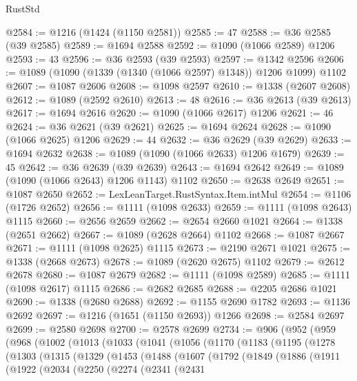 \begin{lexlean}{RustStd}
\begin{coremodule}
@2584 := @1216 (@1424 (@1150 @2581))
@2585 := 47
@2588 := @36 @2585 (@39 @2585)
@2589 := @1694 @2588
@2592 := @1090 (@1066 @2589) @1206
@2593 := 43
@2596 := @36 @2593 (@39 @2593)
@2597 := @1342 @2596
@2606 := @1089 (@1090 (@1339 (@1340 (@1066 @2597) @1348)) @1206 @1099) @1102
@2607 := @1087 @2606
@2608 := @1098 @2597
@2610 := @1338 (@2607 @2608)
@2612 := @1089 (@2592 @2610)
@2613 := 48
@2616 := @36 @2613 (@39 @2613)
@2617 := @1694 @2616
@2620 := @1090 (@1066 @2617) @1206
@2621 := 46
@2624 := @36 @2621 (@39 @2621)
@2625 := @1694 @2624
@2628 := @1090 (@1066 @2625) @1206
@2629 := 44
@2632 := @36 @2629 (@39 @2629)
@2633 := @1694 @2632
@2638 := @1089 (@1090 (@1066 @2633) @1206 @1679)
@2639 := 45
@2642 := @36 @2639 (@39 @2639)
@2643 := @1694 @2642
@2649 := @1089 (@1090 (@1066 @2643) @1206 @1143) @1102
@2650 := @2638 @2649
@2651 := @1087 @2650
@2652 := LexLeanTarget.RustSyntax.Item.intMul
@2654 := @1106 (@1726 @2652)
@2656 := @1111 (@1098 @2633)
@2659 := @1111 (@1098 @2643) @1115
@2660 := @2656 @2659
@2662 := @2654 @2660 @1021
@2664 := @1338 (@2651 @2662)
@2667 := @1089 (@2628 @2664) @1102
@2668 := @1087 @2667
@2671 := @1111 (@1098 @2625) @1115
@2673 := @2190 @2671 @1021
@2675 := @1338 (@2668 @2673)
@2678 := @1089 (@2620 @2675) @1102
@2679 := @2612 @2678
@2680 := @1087 @2679
@2682 := @1111 (@1098 @2589)
@2685 := @1111 (@1098 @2617) @1115
@2686 := @2682 @2685
@2688 := @2205 @2686 @1021
@2690 := @1338 (@2680 @2688)
@2692 := @1155 @2690 @1782
@2693 := @1136 @2692
@2697 := @1216 (@1651 (@1150 @2693)) @1266
@2698 := @2584 @2697
@2699 := @2580 @2698
@2700 := @2578 @2699
@2734 := @906
    (@952
      (@959
        (@968
          (@1002
            (@1013
              (@1033
                (@1041
                  (@1056
                    (@1170
                      (@1183
                        (@1195
                          (@1278
                            (@1303
                              (@1315
                                (@1329
                                  (@1453
                                    (@1488
                                      (@1607
                                        (@1792
                                          (@1849
                                            (@1886
                                              (@1911
                                                (@1922
                                                  (@2034
                                                    (@2250
                                                      (@2274
                                                        (@2341
                                                          (@2431

\end{coremodule}
\end{lexlean}
